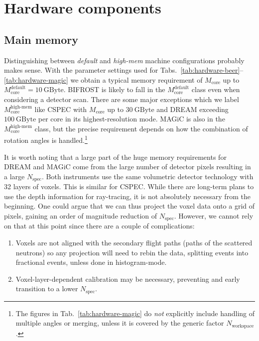 \documentclass[a4paper,english,numbers=noenddot,bibliography=totoc,chapterprefix=on,DIV=12]{scrartcl}
\newcommand{\Nworkspace}{N_{\text{workspace}}}
\newcommand{\Nspec}{N_{\text{spec}}}
\newcommand{\Mcore}{M_{\text{core}}}
\newcommand{\bifrost}{BIFROST\xspace}
\newcommand{\cspec}{CSPEC\xspace}
\newcommand{\dream}{DREAM\xspace}
\newcommand{\magic}{MAGiC\xspace}
\begin{document}
\section{Hardware components}


\subsection{Main memory}

Distinguishing between \emph{default} and \emph{high-mem} machine configurations probably makes sense.
With the parameter settings used for Tabs.~\ref{tab:hardware-beer}--\ref{tab:hardware-magic} we obtain a typical memory requirement of $\Mcore$ up to $\Mcore^{\text{default}} = 10~\mathrm{GByte}$.
\bifrost is likely to fall in the $\Mcore^{\text{default}}$ class even when considering a detector scan.
There are some major exceptions which we label $\Mcore^{\text{high-mem}}$ like \cspec with $\Mcore$ up to $30~\mathrm{GByte}$ and \dream exceeding $100~\mathrm{GByte}$ per core in its highest-resolution mode.
\magic is also in the $\Mcore^{\text{high-mem}}$ class, but the precise requirement depends on how the combination of rotation angles is handled.\footnote{The figures in Tab.~\ref{tab:hardware-magic} do \emph{not} explicitly include handling of multiple angles or merging, unless it is covered by the generic factor $\Nworkspace$.}

It is worth noting that a large part of the huge memory requirements for \dream and \magic come from the large number of detector pixels resulting in a large $\Nspec$.
Both instruments use the same volumetric detector technology with 32 layers of voxels.
This is similar for \cspec.
While there are long-term plans to use the depth information for ray-tracing, it is not absolutely necessary from the beginning.
One could argue that we can thus project the voxel data onto a grid of pixels, gaining an order of magnitude reduction of $\Nspec$.
However, we cannot rely on that at this point since there are a couple of complications:
\begin{enumerate}
  \item Voxels are not aligned with the secondary flight paths (paths of the scattered neutrons) so any projection will need to rebin the data, splitting events into fractional events, unless done in histogram-mode.
  \item Voxel-layer-dependent calibration may be necessary, preventing and early transition to a lower $\Nspec$.
\end{enumerate}
\end{document}
